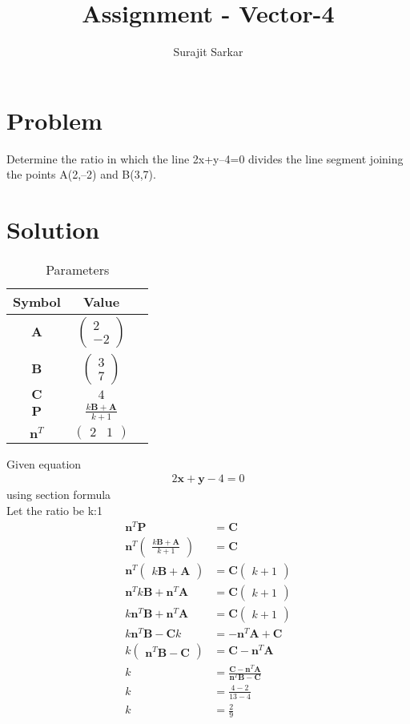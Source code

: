 \documentclass[journal,12pt,twocolumn]{IEEEtran}
\title{\mytitle}
\title{
Assignment - Vector-4
}
\author{Surajit Sarkar}
\newcommand{\myvec}[1]{\ensuremath{\begin{pmatrix}#1\end{pmatrix}}}
\let\vec\mathbf
\begin{document}
\maketitle
\tableofcontents
\bigskip
\section{\textbf{Problem}}
Determine the ratio in which the line 2x+y–4=0 divides the line segment joining the points A(2,–2) and B(3,7).
\section{\textbf{Solution}}
\begin{table}[h]
    \centering
    \begin{tabular}{|c|c|c|}
       \hline
       \textbf{Symbol}&\textbf{Value}  \\
       \hline
	    $\vec{A}$ & $\myvec{
		    2\\
		    -2}$
	    \\
        \hline
	    $\vec{B}$ & $\myvec{3\\7}$
 \\
        \hline
	    $\vec{C}$ & $4$
 \\
       \hline
            $\vec{P}$ & $\frac{k\vec{B+A}}{k+1}$\\
       \hline
       $\vec{n}^T$ & $\myvec{2&1}$\\
       \hline
    \end{tabular}
    \caption{Parameters}
    \label{tab:my_label}
\end{table}
Given equation
\begin{align}
    2\vec{x}+\vec{y}-4=0
\end{align}
using section formula\\Let the ratio be k:1
\begin{align}
    \vec{n}^T\vec{P}&=\vec{C}\\
    \vec{n}^T\myvec{\frac{k\vec{B+A}}{k+1}}&=\vec{C}\\
    \vec{n}^T\myvec{k\vec{B+A}}&=\vec{C}\myvec{k+1}\\
    \vec{n}^Tk\vec{B}+\vec{n}^T\vec{A}&=\vec{C}\myvec{k+1}\\
    k\vec{n}^T\vec{B}+\vec{n}^T\vec{A}&=\vec{C}\myvec{k+1}\\
    k\vec{n}^T\vec{B-C}k&=-\vec{n}^T\vec{A}+\vec{C}\\
    k\myvec{\vec{n}^T\vec{B}-\vec{C}}&=\vec{C}-\vec{n}^T\vec{A}\\
    k&=\frac{\vec{C}-\vec{n}^T\vec{A}}{\vec{n}^T\vec{B}-\vec{C}}\\
    k&=\frac{4-2}{13-4}\\
    k&=\frac{2}{9}
\end{align}
\end{document}
